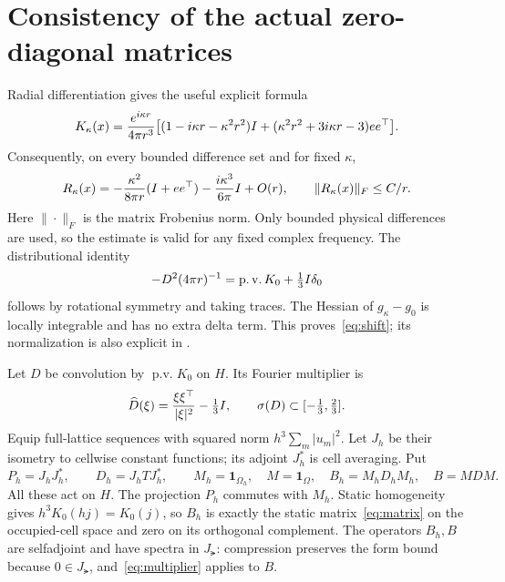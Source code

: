 \documentclass[11pt]{article}
\theoremstyle{remark}\newtheorem{remark}[theorem]{Remark}
\newcommand{\pv}{\operatorname{p.v.}}\newcommand{\dist}{\operatorname{dist}}
\begin{document}
\section{Consistency of the actual zero-diagonal matrices}\label{sec:consistency}

Radial differentiation gives the useful explicit formula
\begin{equation}\label{eq:radial}
 K_\kappa(x)=\frac{e^{i\kappa r}}{4\pi r^3}
 \big[(1-i\kappa r-\kappa^2r^2)I
       +(\kappa^2r^2+3i\kappa r-3)ee^\top\big].
\end{equation}
Consequently, on every bounded difference set and for fixed $\kappa$,
\begin{equation}\label{eq:remainder}
 R_\kappa(x)=-\frac{\kappa^2}{8\pi r}(I+ee^\top)
             -\frac{i\kappa^3}{6\pi}I+O(r),
 \qquad \|R_\kappa(x)\|_F\le C/r.
\end{equation}
Here $\|\cdot\|_F$ is the matrix Frobenius norm. Only bounded physical differences are used, so the estimate is valid for any fixed complex frequency. The distributional identity
\[
 -D^2(4\pi r)^{-1}=\pv K_0+\tfrac13\Id\delta_0
\]
follows by rotational symmetry and taking traces. The Hessian of $g_\kappa-g_0$ is locally integrable and has no extra delta term. This proves~\eqref{eq:shift}; its normalization is also explicit in \cite[(1.7), (3.39)]{CDN}.

Let $D$ be convolution by $\pv K_0$ on $H$. Its Fourier multiplier is
\begin{equation}\label{eq:multiplier}
 \widehat D(\xi)=\frac{\xi\xi^\top}{|\xi|^2}-\tfrac13I,
 \qquad \sigma(D)\subset[-\tfrac13,\tfrac23].
\end{equation}
Equip full-lattice sequences with squared norm $h^3\sum_m|u_m|^2$. Let $J_h$ be their isometry to cellwise constant functions; its adjoint $J_h^*$ is cell averaging. Put
\[
 P_h=J_hJ_h^*,\qquad D_h=J_hTJ_h^*,\qquad
 M_h=\mathbf1_{\Omega_h},\quad M=\mathbf1_\Omega,
 \quad B_h=M_hD_hM_h,\quad B=MDM.
\]
All these act on $H$. The projection $P_h$ commutes with $M_h$. Static homogeneity gives $h^3K_0(hj)=K_0(j)$, so $B_h$ is exactly the static matrix~\eqref{eq:matrix} on the occupied-cell space and zero on its orthogonal complement. The operators $B_h,B$ are selfadjoint and have spectra in $J_\lat$: compression preserves the form bound because $0\in J_\lat$, and~\eqref{eq:multiplier} applies to $B$.
\end{document}
